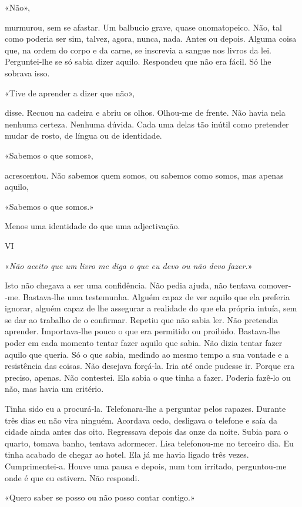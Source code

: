 «Não»,

murmurou, sem se afastar. Um balbucio grave, quase onomatopeico. Não,
tal como poderia ser sim, talvez, agora, nunca, nada. Antes ou depois.
Alguma coisa que, na ordem do corpo e da carne, se inscrevia a sangue
nos livros da lei. Perguntei­‑lhe se só sabia dizer aquilo. Respondeu
que não era fácil. Só lhe sobrava isso.

«Tive de aprender a dizer que não»,

disse. Recuou na cadeira e abriu os olhos. Olhou­‑me de frente. Não
havia nela nenhuma certeza. Nenhuma dúvida. Cada uma delas tão inútil
como pretender mudar de rosto, de língua ou de identidade.

«Sabemos o que somos»,

acrescentou. Não sabemos quem somos, ou sabemos como somos, mas apenas
aquilo,

«Sabemos o que somos.»

Menos uma identidade do que uma adjectivação.

VI

«\emph{Não aceito que um livro me diga o que eu devo ou não devo
fazer.}»

Isto não chegava a ser uma confidência. Não pedia ajuda, não tentava
comover­‑me. Bastava­‑lhe uma testemunha. Alguém capaz de ver aquilo que
ela preferia ignorar, alguém capaz de lhe assegurar a realidade do que
ela própria intuía, sem se dar ao trabalho de o confirmar. Repetiu que
não sabia ler. Não pretendia aprender. Importava­‑lhe pouco o que era
permitido ou proibido. Bastava­‑lhe poder em cada momento tentar fazer
aquilo que sabia. Não dizia tentar fazer aquilo que queria. Só o que
sabia, medindo ao mesmo tempo a sua vontade e a resistência das coisas.
Não desejava forçá­‑la. Iria até onde pudesse ir. Porque era preciso,
apenas. Não contestei. Ela sabia o que tinha a fazer. Poderia fazê­‑lo
ou não, mas havia um critério.

Tinha sido eu a procurá­‑la. Telefonara­‑lhe a perguntar pelos rapazes.
Durante três dias eu não vira ninguém. Acordava cedo, desligava o
telefone e saía da cidade ainda antes das oito. Regressava depois das
onze da noite. Subia para o quarto, tomava banho, tentava adormecer.
Lisa telefonou­‑me no terceiro dia. Eu tinha acabado de chegar ao hotel.
Ela já me havia ligado três vezes. Cumprimentei­‑a. Houve uma pausa e
depois, num tom irritado, perguntou­‑me onde é que eu estivera. Não
respondi.

«Quero saber se posso ou não posso contar contigo.»


